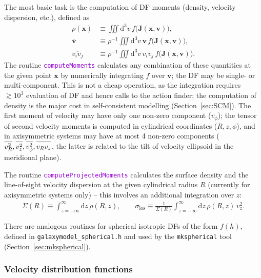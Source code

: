 \documentclass[12pt]{article}
\newcommand{\ttt}[1]{\textcolor{darkviolet}{\texttt{#1}}}
\renewcommand{\d}{\mathrm{d}}
\newcommand{\bv}{\boldsymbol{v}}
\newcommand{\bx}{\boldsymbol{x}}
\newcommand{\bJ}{\boldsymbol{J}}
\begin{document}
The most basic task is the computation of DF moments (density, velocity dispersion, etc.), defined as
\begin{align*}
\rho(\bx) &\equiv \iiint \d ^3v\, f\big(\bJ(\bx,\bv)\big), \\
\overline{\bv} &\equiv \rho^{-1} \iiint \d ^3v \,\bv\, f\big(\bJ(\bx,\bv)\big), \\
\overline{v_i v_j} &\equiv \rho^{-1} \iiint \d ^3v \,v_i v_j\, f\big(\bJ(\bx,\bv)\big).
\end{align*}
The routine \ttt{computeMoments} calculates any combination of these quantities at the given point $\bx$ by numerically integrating $f$ over $\bv$; the DF may be single- or multi-component. 
This is not a cheap operation, as the integration requires $\gtrsim 10^3$ evaluation of DF and hence calls to the action finder; the computation of density is the major cost in self-consistent modelling (Section~\ref{sec:SCM}). The first moment of velocity may have only one non-zero component ($\overline{v_\phi}$); the tensor of second velocity moments is computed in cylindrical coordinates ($R,z,\phi$), and in axisymmetric systems may have at most 4 non-zero components ($\overline{\strut v_R^2}, \overline{\strut v_z^2}, \overline{\strut v_\phi^2}, \overline{\strut v_R v_z}$, the latter is related to the tilt of velocity ellipsoid in the meridional plane).

The routine \ttt{computeProjectedMoments} calculates the surface density and the line-of-sight velocity dispersion at the given cylindrical radius $R$ (currently for axisymmetric systems only) -- this involves an additional integration over $z$:
\begin{align*}
\Sigma(R) \equiv \int_{z=-\infty}^\infty \d z\, \rho(R,z), \qquad
\sigma_\mathrm{los} \equiv \frac{1}{\Sigma(R)} \int_{z=-\infty}^\infty \d z\, \rho(R,z)\, v_z^2 .
\end{align*}

There are analogous routines for spherical isotropic DFs of the form $f(h)$, defined in \texttt{galaxymodel_spherical.h} and used by the \texttt{mkspherical} tool (Section~\ref{sec:mkspherical}).


\subsubsection{Velocity distribution functions}  \label{sec:VDF}
\end{document}
